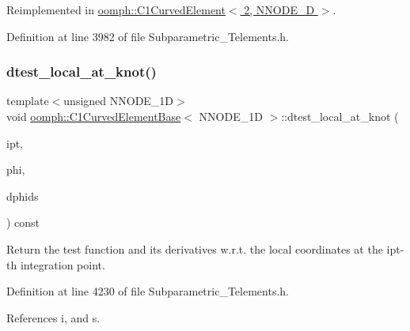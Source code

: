 Reimplemented in \hyperlink{classoomph_1_1C1CurvedElement_3_012_00_01NNODE__1D_01_4_a584224d462537606568ccc4fd6d0b21a}{oomph\+::\+C1\+Curved\+Element$<$ 2, N\+N\+O\+D\+E\+\_\+D $>$}.



Definition at line 3982 of file Subparametric\+\_\+\+Telements.\+h.

\mbox{\label{classoomph_1_1C1CurvedElementBase_a5fcabaae9a008bf601ed01b81e2ee735}} 
\subsubsection{\texorpdfstring{dtest\+\_\+local\+\_\+at\+\_\+knot()}{dtest\_local\_at\_knot()}}
{\footnotesize\ttfamily template$<$unsigned N\+N\+O\+D\+E\+\_\+1D$>$ \\
void \hyperlink{classoomph_1_1C1CurvedElementBase}{oomph\+::\+C1\+Curved\+Element\+Base}$<$ N\+N\+O\+D\+E\+\_\+1D $>$\+::dtest\+\_\+local\+\_\+at\+\_\+knot (\begin{DoxyParamCaption}\item[{const unsigned \&}]{ipt,  }\item[{\hyperlink{classoomph_1_1Shape}{Shape} \&}]{phi,  }\item[{\hyperlink{classoomph_1_1DShape}{D\+Shape} \&}]{dphids }\end{DoxyParamCaption}) const\hspace{0.3cm}{\ttfamily [inline]}}



Return the test function and its derivatives w.\+r.\+t. the local coordinates at the ipt-\/th integration point. 



Definition at line 4230 of file Subparametric\+\_\+\+Telements.\+h.



References i, and s.

\mbox{\label{classoomph_1_1C1CurvedElementBase_aee42a8d77efc26f00b8d13337f9fb4f4}} 
